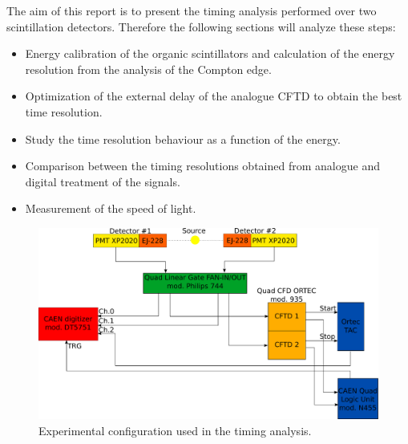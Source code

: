 The aim of this report is to present the timing analysis performed over two scintillation detectors. Therefore the  following sections will analyze these steps:
\begin{itemize}
\item Energy calibration of the organic scintillators and
calculation of the energy resolution from the analysis of
the Compton edge.
\item Optimization of the external delay of the analogue
CFTD to obtain the best time resolution.
\item Study the time resolution behaviour as a function of the
energy.
\item Comparison between the timing resolutions obtained
from analogue and digital treatment of the signals.
\item Measurement of the speed of light. 
\end{itemize}

\begin{figure}[h!]
	\centering
	\includegraphics[width=\textwidth]{immagini/SetUp.pdf}
	\caption{Experimental configuration used in the timing analysis.}
	\label{fig:Set_up}
\end{figure}